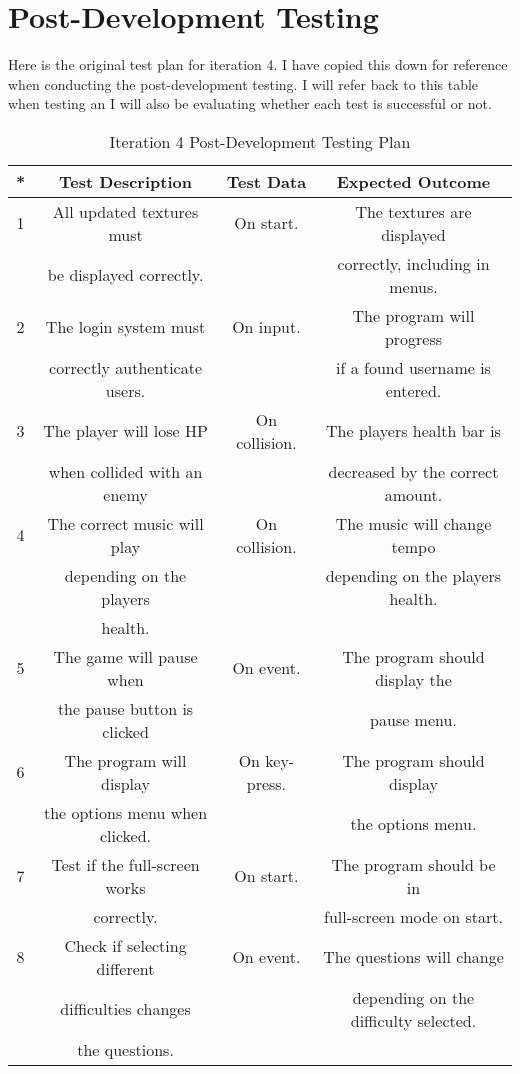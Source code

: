 \documentclass[12pt]{report}
\begin{document}
\section{Post-Development Testing}
Here is the original test plan for iteration 4. I have copied this down for reference when conducting the post-development testing. I will refer back to this table when testing an I will also be evaluating whether each test is successful or not.

\begin{table}[H]
    \centering
    \begin{tabular}{|c|c|c|c|}
    \hline
    \textbf{*} & \textbf{Test Description} & \textbf{Test Data} & \textbf{Expected Outcome}\\
    \hline
    1 & All updated textures must & On start. & The textures are displayed \\
    & be displayed correctly. & & correctly, including in menus.\\
    \hline
    2 & The login system must  & On input. & The program will progress\\
      & correctly authenticate users. & & if a found username is entered. \\
    \hline
    3 & The player will lose HP  & On collision. & The players health bar is\\
    & when collided with an enemy & & decreased by the correct amount. \\
    \hline
    4 & The correct music will play & On collision. & The music will change tempo\\
    & depending on the players & & depending on the players health.  \\
    & health. & & \\
    \hline
    5 & The game will pause when & On event. & The program should display the \\
    & the pause button is clicked & & pause menu.\\
    \hline
    6 & The program will display & On key-press. & The program should display\\
    & the options menu when clicked. & & the options menu.\\
    \hline
    7 & Test if the full-screen works & On start. & The program should be in\\
    & correctly. & & full-screen mode on start.\\
    \hline
    8 & Check if selecting different & On event. & The questions will change \\
      & difficulties changes & & depending on the difficulty selected. \\
      & the questions. & & \\
    \hline
    \end{tabular}
    \caption{Iteration 4 Post-Development Testing Plan}
    \label{TestTable}
\end{table}
\end{document}
